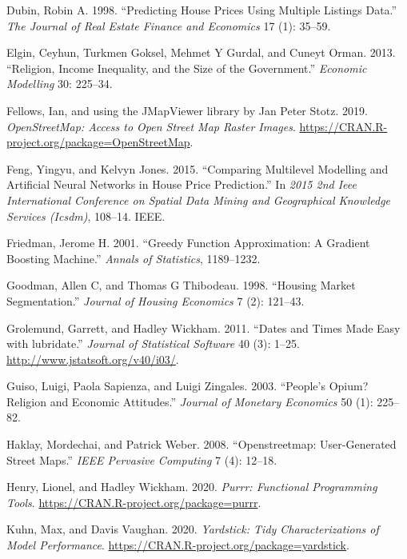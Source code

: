 \documentclass[conference,final,]{IEEEtran}
\newlength{\cslhangindent}
\newenvironment{cslreferences}%
  {\setlength{\parindent}{0pt}%
  \everypar{\setlength{\hangindent}{\cslhangindent}}\ignorespaces}%
  {\par}
\begin{document}
\begin{cslreferences}
\leavevmode\hypertarget{ref-dubin1998predicting}{}%
Dubin, Robin A. 1998. ``Predicting House Prices Using Multiple Listings Data.'' \emph{The Journal of Real Estate Finance and Economics} 17 (1): 35--59.

\leavevmode\hypertarget{ref-elgin2013religion}{}%
Elgin, Ceyhun, Turkmen Goksel, Mehmet Y Gurdal, and Cuneyt Orman. 2013. ``Religion, Income Inequality, and the Size of the Government.'' \emph{Economic Modelling} 30: 225--34.

\leavevmode\hypertarget{ref-R-OpenStreetMap}{}%
Fellows, Ian, and using the JMapViewer library by Jan Peter Stotz. 2019. \emph{OpenStreetMap: Access to Open Street Map Raster Images}. \url{https://CRAN.R-project.org/package=OpenStreetMap}.

\leavevmode\hypertarget{ref-feng2015comparing}{}%
Feng, Yingyu, and Kelvyn Jones. 2015. ``Comparing Multilevel Modelling and Artificial Neural Networks in House Price Prediction.'' In \emph{2015 2nd Ieee International Conference on Spatial Data Mining and Geographical Knowledge Services (Icsdm)}, 108--14. IEEE.

\leavevmode\hypertarget{ref-friedman2001greedy}{}%
Friedman, Jerome H. 2001. ``Greedy Function Approximation: A Gradient Boosting Machine.'' \emph{Annals of Statistics}, 1189--1232.

\leavevmode\hypertarget{ref-goodman1998housing}{}%
Goodman, Allen C, and Thomas G Thibodeau. 1998. ``Housing Market Segmentation.'' \emph{Journal of Housing Economics} 7 (2): 121--43.

\leavevmode\hypertarget{ref-R-lubridate}{}%
Grolemund, Garrett, and Hadley Wickham. 2011. ``Dates and Times Made Easy with lubridate.'' \emph{Journal of Statistical Software} 40 (3): 1--25. \url{http://www.jstatsoft.org/v40/i03/}.

\leavevmode\hypertarget{ref-guiso2003people}{}%
Guiso, Luigi, Paola Sapienza, and Luigi Zingales. 2003. ``People's Opium? Religion and Economic Attitudes.'' \emph{Journal of Monetary Economics} 50 (1): 225--82.

\leavevmode\hypertarget{ref-haklay2008openstreetmap}{}%
Haklay, Mordechai, and Patrick Weber. 2008. ``Openstreetmap: User-Generated Street Maps.'' \emph{IEEE Pervasive Computing} 7 (4): 12--18.

\leavevmode\hypertarget{ref-R-purrr}{}%
Henry, Lionel, and Hadley Wickham. 2020. \emph{Purrr: Functional Programming Tools}. \url{https://CRAN.R-project.org/package=purrr}.

\leavevmode\hypertarget{ref-R-yardstick}{}%
Kuhn, Max, and Davis Vaughan. 2020. \emph{Yardstick: Tidy Characterizations of Model Performance}. \url{https://CRAN.R-project.org/package=yardstick}.


\end{cslreferences}
\end{document}
